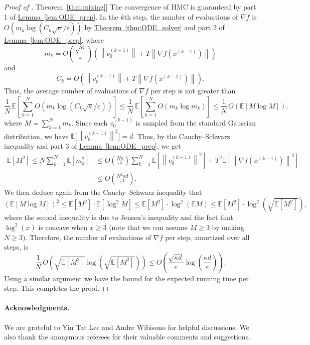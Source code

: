 \documentclass[11pt]{article}
\numberwithin{equation}{section}
\theoremstyle{definition}
\theoremstyle{plain}
\newcommand{\expref}[2]{\hyperref[#2]{#1~\ref{#2}}}
\newcommand{\Exp}{\mathbb{E}}
\newcommand{\norm}[1]{\left\lVert #1 \right\rVert}
\newcommand{\grad}{\nabla}
\newcommand{\eps}{\varepsilon}
\begin{document}
\begin{proof}[Proof of \expref{Theorem}{thm:mixing}]
	The convergence of HMC is guaranteed by part 1 of \expref{Lemma}{lem:ODE_prep}. In the $k$th step, the number of evaluations of $\grad f$ is $O(m_k \log (C_k \sqrt{\kappa}/\eps))$ by \expref{Theorem}{thm:ODE_solver} and part 2 of \expref{Lemma}{lem:ODE_prep}, where
	\[
	m_k = O\left( \frac{\sqrt{\kappa}}{\eps}\right) \left( \norm{v_0^{(k-1)}} + T\norm{\grad f(x^{(k-1)})}  \right) 
	\]
	and
	\[
	C_k = O\left( \norm{v_0^{(k-1)}} + T\norm{\grad f(x^{(k-1)})} \right).
	\]
Thus, the average number of evaluations of $\grad f$ per step is
%
not greater than  %
	\[
	\frac{1}{N}\, \Exp \left[ \sum_{k=1}^N O(m_k \log (C_k \sqrt{\kappa}/\eps)) \right] \le \frac{1}{N}\, \Exp \left[ \sum_{k=1}^N O(m_k \log m_k) \right]
	\le \frac{1}{N} \, O\left( \Exp \left[ M \log M \right] \right),
	\]
	where $M = \sum_{k=1}^N m_k$. Since each $v_0^{(k-1)}$ is sampled from the standard Gaussian distribution, we have $\Exp \Big[ \norm{v_0^{(k-1)}}^2 \Big] = d$. Thus, by the Cauchy--Schwarz inequality and part 3 of \expref{Lemma}{lem:ODE_prep}, we get
	\begin{align*}
		\Exp\left[ M^2 \right] \le N \sum_{k=1}^N \Exp\left[ m_k^2 \right] 
		&\le O\left( \frac{N\kappa}{\eps^2} \right) \sum_{k=1}^N \Exp\left[ \norm{v_0^{(k-1)}}^2 \right] + T^2 \Exp\left[ \norm{\grad f(x^{(k-1)})}^2 \right]\\ 
		&\le O\left( \frac{N^2\kappa d}{\eps^2} \right).
	\end{align*}
	We then deduce again from the Cauchy--Schwarz inequality that
	\[
	\left(\Exp[M \log M]\right)^2 \le \Exp\left[M^2\right] \cdot \Exp\left[\log^2 M\right] \le \Exp\left[ M^2 \right] \cdot \log^2\left( \Exp M \right) 
	\le \Exp[M^2] \cdot \log^2\left( \sqrt{\Exp\left[ M^2 \right]} \right), 
	\]
	where the second inequality is due to Jensen's inequality and the fact that $\log^2(x)$ is concave when $x \geq 3$ (note that we can assume $M \ge 3$ by making $N \ge 3$). 
	Therefore, the number of evaluations of $\grad f$ per step, amortized over all steps, is 
	\[
	\frac{1}{N}\, O\left( \sqrt{\Exp[M^2]}  \log\left( \sqrt{\Exp\left[ M^2 \right]} \right) \right) \le O\left( \frac{\sqrt{\kappa d}}{\eps} \log\left( \frac{\kappa d}{\eps} \right) \right).
	\]
	Using a similar argument we have the bound for the expected running time per step. This completes the proof.
\end{proof}

\paragraph{Acknowledgments.} We are grateful to Yin Tat Lee and Andre Wibisono for helpful discussions. 
We also thank the anonymous referees for their valuable comments and suggestions. 
\end{document}
